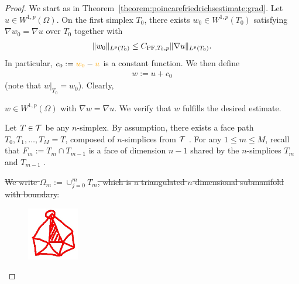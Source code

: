 \documentclass[10pt,letterpaper]{article}
\newcommand\cye[1]{%
  \protect\leavevmode
  \begingroup
    \color{red!35!yellow}%
    #1%
  \endgroup
}
\begin{document}
\begin{proof}

\cye{We start as in Theorem~\ref{theorem:poincarefriedrichsestimate:grad}.}  Let $u \in W^{1,p}(\Omega)$. 
 \cye{On the first} simplex $T_{0}$, there exists $w_0 \in W^{1,p}(T_{0})$ satisfying $\nabla w_0 = \nabla u$ over $T_{0}$ together with 
 \begin{gather*}
    \| w_0 \|_{L^{p}(T_{0})} \leq C_{{\rm{PF}},T_{0},p} \| \nabla u \|_{L^{p}(T_{0})}.
 \end{gather*}
 In particular, $c_{0} := \cye{w_0} - \cye{u}$ is a constant function. 
 \cye{We then define 
   \begin{align*}
    w := u + c_0
  \end{align*} 
 (note that $w|_{T_{0}} = w_0$). Clearly,} 
 $w \in W^{1,p}(\Omega)$ with $\nabla w = \nabla u$. \cye{We verify that $w$ fulfills the desired estimate.}
 
 Let $T \in {\mathcal T}$ be any $n$-simplex. 
 By assumption, there exists a \cye{face} path $T_0, T_1, \dots, T_M = T$, composed of $n$-simplices \cye{from ${\mathcal T}$}. 
 For any $1 \leq m \leq M$, \cye{recall that} $F_m := T_m \cap T_{m-1}$ \cye{is}  a face of dimension $n-1$ \cye{shared by the $n$-simplices $T_m$ and $T_{m-1}$}. 

    \cye{\sout{We write $\Omega_m := \cup_{j=0}^{m} T_m$, which is a triangulated $n$-dimensional submanifold with boundary.}}

\begin{figure}[h]
\centerline{\includegraphics[width=0.2\textwidth]{homotopic_ball.jpg}}
\end{figure}


\end{proof}
\end{document}
